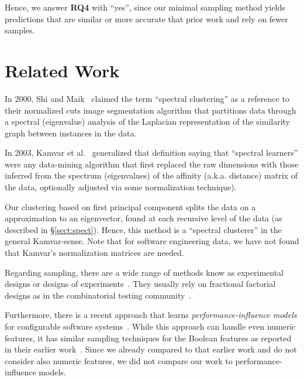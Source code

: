 \documentclass{sig-alternative}
\newcommand{\tion}[1]{\S\ref{sect:#1}}
\begin{document}
\begin{myshadowbox}
Hence, we answer {\bf RQ4} with ``yes'',
since our minimal sampling method yields predictions that are similar or more accurate that prior
work and rely on fewer samples.
\end{myshadowbox}


 \section{Related Work}
\label{sect:related}
 
In 2000, Shi and Maik~\cite{shi00} claimed the term ``spectral clustering'' as a reference to their normalized cuts
image
segmentation algorithm that  partitions data through a spectral (eigenvalue) analysis of the  
Laplacian representation of the similarity graph between instances in the data.

In 2003, Kamvar et al.~\cite{kamvar2003spectral}  generalized that definition saying that ``spectral learners''
were any data-mining algorithm that first replaced the raw
dimensions with those inferred from the spectrum (eigenvalues) of the affinity (a.k.a. distance)
matrix of the data, optionally adjusted via some normalization technique).

Our clustering based on first principal component splits the data on a   approximation to an eigenvector, found at each recursive level
of the data (as described in \tion{spect}). 
Hence, this  method is a ``spectral clusterer'' in the general Kamvar-sense. 
Note that
for software engineering data, we have
not found that Kamvar's normalization matrices are needed.

Regarding sampling, there are a wide range of methods know as experimental designs or designs of experiments~\cite{pukelsheim2006optimal}. They usually rely on fractional factorial designs as in the combinatorial testing community~\cite{Kuhn:2013}. 

Furthermore, there is a recent approach that learns {\em performance-influence models} for configurable software systems~\cite{SGA+15}. While this approach can handle even numeric features, it has similar sampling techniques for the Boolean features as reported in their earlier work~\cite{siegmund2012predicting}. Since we already compared to that earlier work and do not consider also numeric features, we did not compare our work to performance-influence models.
 
\end{document}
